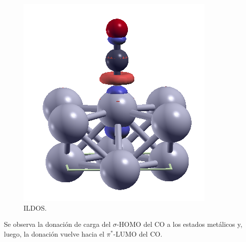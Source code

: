     \begin{figure}[H]
        \centering
        \includegraphics[scale = 0.5]{figs/D3/CO_DIFDEN.png}
        \caption{ILDOS.}
    \end{figure}


    Se observa la donación de carga del $\sigma$-HOMO del CO a los estados metálicos y, luego, la donación vuelve hacia el $\pi^*$-LUMO del CO.
